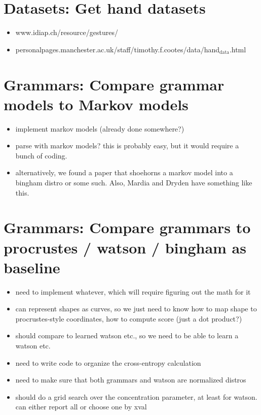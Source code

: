 \documentclass{book}
\begin{document}
\section{Datasets: Get hand datasets}
\label{sec-5_8}


\begin{itemize}
\item www.idiap.ch/resource/gestures/
\item personalpages.manchester.ac.uk/staff/timothy.f.cootes/data/hand$_{\mathrm{data}}$.html
\end{itemize}
\section{Grammars: Compare grammar models to Markov models}
\label{sec-5_9}

\begin{itemize}
\item implement markov models (already done somewhere?)
\item parse with markov models? this is probably easy, but it would
    require a bunch of coding.
\item alternatively, we found a paper that shoehorns a markov model into
    a bingham distro or some such. Also, Mardia and Dryden have
    something like this.
\end{itemize}
\section{Grammars: Compare grammars to procrustes / watson / bingham as baseline}
\label{sec-5_10}

\begin{itemize}
\item need to implement whatever, which will require figuring out the
    math for it
\item can represent shapes as curves, so we just need to know how to map
    shape to procrustes-style coordinates, how to compute score (just
    a dot product?)
\item should compare to learned watson etc., so we need to be able to learn a
    watson etc.
\item need to write code to organize the cross-entropy calculation
\item need to make sure that both grammars and watson are normalized distros
\item should do a grid search over the concentration parameter, at least
    for watson. can either report all or choose one by xval
\end{itemize}
\end{document}
